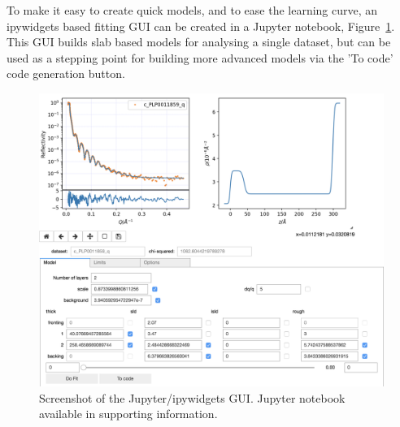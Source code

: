 \documentclass[12pt]{article}
\begin{document}
To make it easy to create quick models, and to ease the learning curve, an ipywidgets \cite{ipywidgets} based fitting GUI can be created in a Jupyter notebook, Figure~\ref{fig:gui}. This GUI builds slab based models for analysing a single dataset, but can be used as a stepping point for building more advanced models via the 'To code' code generation button.

\begin{figure}
  \includegraphics[width=\linewidth]{./datasets/gui.png}
  \caption{Screenshot of the Jupyter/ipywidgets GUI. Jupyter notebook available in supporting information.}
  \label{fig:gui}
\end{figure}
\end{document}

